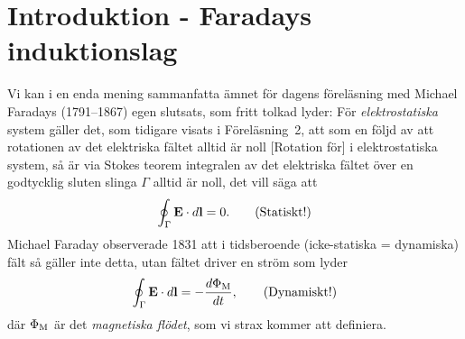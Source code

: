 {{{{
\vfill\eject\copyrights

\section{Introduktion - Faradays induktionslag}
Vi kan i en enda mening sammanfatta {\"a}mnet f{\"o}r dagens
f{\"o}rel{\"a}sning
med Michael Faradays (1791--1867)  egen
slutsats, som fritt tolkad lyder:
\noindent
F{\"o}r {\it elektrostatiska}  system g{\"a}ller det, som
tidigare visats i F{\"o}rel{\"a}sning~2, att som en f{\"o}ljd av att rotationen
av det elektriska f{\"a}ltet alltid {\"a}r noll [Rotation f{\"o}r]  i elektrostatiska system, s{\aa} {\"a}r via Stokes
teorem  integralen av det elektriska f{\"a}ltet {\"o}ver en
godtycklig sluten slinga $\Gamma$ alltid {\"a}r noll, det vill s{\"a}ga
att
$$
  \oint_{\Gamma}{\bf E}\cdot d{\bf l}=0.
  \qquad\hbox{(Statiskt!)}
$$
Michael Faraday observerade 1831 att i tidsberoende (icke-statiska = dynamiska)
f{\"a}lt s{\aa} g{\"a}ller inte detta, utan f{\"a}ltet driver en str{\"o}m som
lyder
$$
  \oint_{\Gamma}{\bf E}\cdot d{\bf l}=-{{d\Phi_{\rm M}}\over{dt}},
  \qquad\hbox{(Dynamiskt!)}
$$
d{\"a}r $\Phi_{\rm M}$ {\"a}r det {\it magnetiska fl{\"o}det}, 
 som vi strax kommer att definiera.
}}}}

